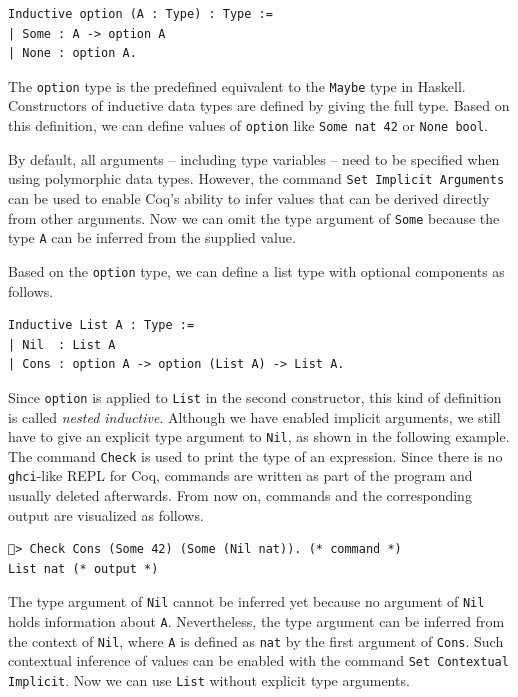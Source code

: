 \documentclass[a4paper, 11pt, fleqn, twoside, abstract=on]{scrreprt}
\newcommand{\hinl}[1]{\texttt{#1}}
\newcommand{\cinl}[1]{\texttt{#1}}
\begin{document}
\begin{verbatim}
Inductive option (A : Type) : Type := 
| Some : A -> option A 
| None : option A.
\end{verbatim}

The \cinl{option} type is the predefined equivalent to the \hinl{Maybe} type in Haskell.
Constructors of inductive data types are defined by giving the full type.
Based on this definition, we can define values of \cinl{option} like \cinl{Some nat 42} or \cinl{None bool}.

By default, all arguments -- including type variables -- need to be specified when using polymorphic data types.
However, the command \cinl{Set Implicit Arguments} can be used to enable Coq's ability to infer values that can be derived directly from other arguments.
Now we can omit the type argument of \cinl{Some} because the type \cinl{A} can be inferred from the supplied value.

Based on the \cinl{option} type, we can define a list type with optional components as follows.
\begin{verbatim}
Inductive List A : Type :=
| Nil  : List A
| Cons : option A -> option (List A) -> List A.
\end{verbatim}

Since \cinl{option} is applied to \cinl{List} in the second constructor, this kind of definition is called \textit{nested inductive}.
Although we have enabled implicit arguments, we still have to give an explicit type argument to \cinl{Nil}, as shown in the following example.
The command \cinl{Check} is used to print the type of an expression.
Since there is no \hinl{ghci}-like REPL for Coq, commands are written as part of the program and usually deleted afterwards.
From now on, commands and the corresponding output are visualized as follows.

\begin{verbatim}
🐔> Check Cons (Some 42) (Some (Nil nat)). (* command *)
List nat (* output *)
\end{verbatim}

The type argument of \cinl{Nil} cannot be inferred yet because no argument of \cinl{Nil} holds information about \cinl{A}.
Nevertheless, the type argument can be inferred from the context of \cinl{Nil}, where \cinl{A} is defined as \cinl{nat} by the first argument of \cinl{Cons}.
Such contextual inference of values can be enabled with the command \cinl{Set Contextual Implicit}.
Now we can use \cinl{List} without explicit type arguments.
\end{document}
